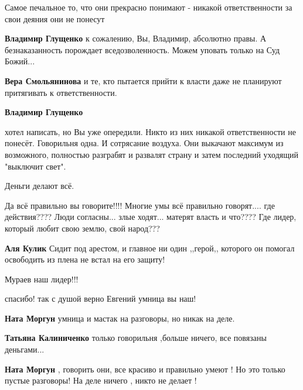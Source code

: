 \begin{itemize}
\begin{itemize}
\end{itemize} %


Самое печальное то, что они прекрасно понимают - никакой ответственности за свои деяния они не понесут

\begin{itemize} %
\textbf{Владимир Глущенко} к сожалению, Вы, Владимир, абсолютно правы. А безнаказанность порождает вседозволенность. Можем уповать только на Суд Божий...

\textbf{Вера Смольянинова} и те, кто пытается прийти к власти даже не планируют притягивать к ответственности.

\textbf{Владимир Глущенко} 

хотел написать, но Вы уже опередили. Никто из них никакой ответственности не
понесёт. Говорильня одна. И сотрясание воздуха. Они выкачают максимум из
возможного, полностью разграбят и развалят страну и затем последний уходящий
"выключит свет".

Деньги делают всё.

\end{itemize} %


Да всё правильно вы говорите!!!! Многие умы всё правильно говорят.... где
действия???? Люди согласны... злые ходят... матерят власть и что???? Где
лидер, который любит свою землю, свой народ???

\begin{itemize} %
\textbf{Аля Кулик} Сидит под арестом, и главное ни один ,,герой,, которого он помогал освободить из плена не встал на его защиту!

Мураев наш лидер!!!
\end{itemize} %


спасибо! так с душой верно Евгений умница вы наш!

\begin{itemize} %
\textbf{Ната Моргун} умница и мастак на разговоры, но никак на деле.

\textbf{Татьяна Калиниченко} только говорильня ,больше ничего, все повязаны деньгами...

\textbf{Ната Моргун} , говорить они, все красиво и правильно умеют ! Но это только пустые разговоры! На деле ничего , никто не делает !
\end{itemize} %


\end{itemize}
